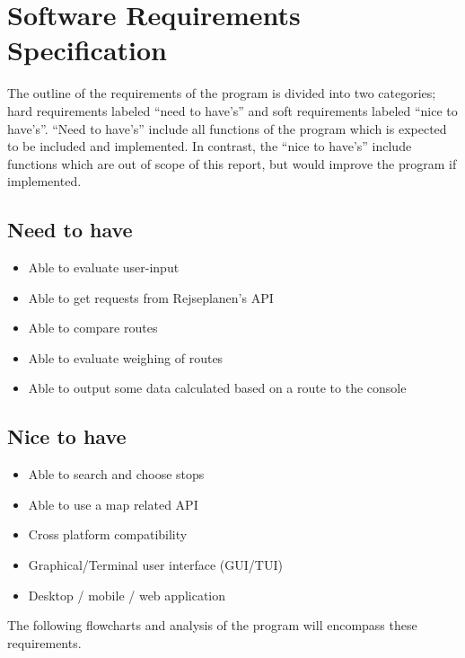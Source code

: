 \section{Software Requirements Specification}\label{sec:software-requirements-specification}


The outline of the requirements of the program is divided into two categories; hard requirements labeled ``need to
have's'' and soft requirements labeled ``nice to have's''.
``Need to have's''
include all functions of the program which is expected to be included and implemented.
In contrast, the ``nice to have's'' include functions which are out of scope of this report, but would improve the
program if implemented.

\subsection{Need to have}\label{subsec:need-to-have}

\begin{itemize}
    \item Able to evaluate user-input
    \item Able to get requests from Rejseplanen’s API
    \item Able to compare routes
    \item Able to evaluate weighing of routes
    \item Able to output some data calculated based on a route to the console
\end{itemize}

\subsection{Nice to have}\label{subsec:nice-to-have}

\begin{itemize}
    \item Able to search and choose stops
    \item Able to use a map related API
    \item Cross platform compatibility
    \item Graphical/Terminal user interface (GUI/TUI)
    \item Desktop / mobile / web application
\end{itemize}

The following flowcharts and analysis of the program will encompass these requirements.
